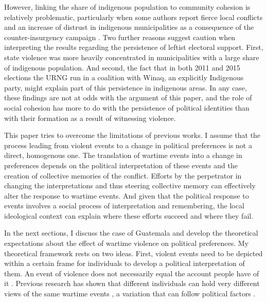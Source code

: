 \documentclass[12pt, notitlepage]{article}
\begin{document}
However, linking the share of indigenous population to community cohesion is relatively problematic, particularly when some authors report fierce local conflicts and an increase of distrust in indigenous municipalities as a consequence of the counter-insurgency campaign \citep[e.g.][]{Burrell:2013aa}.
Two further reasons suggest caution when interpreting the results regarding the persistence of leftist electoral support.
First, state violence was more heavily concentrated in municipalities with a large share of indigenous population.
And second, the fact that in both 2011 and 2015 elections the URNG run in a coalition with Winaq, an explicitly Indigenous party, might explain part of this persistence in indigenous areas.
In any case, these findings are not at odds with the argument of this paper, and the role of social cohesion has more to do with the persistence of political identities than with their formation as a result of witnessing violence.

This paper tries to overcome the limitations of previous works.
I assume that the process leading from violent events to a change in political preferences is not a direct, homogenous one.
The translation of wartime events into a change in preferences depends on the political interpretation of these events and the creation of collective memories of the conflict.
Efforts by the perpetrator in changing the interpretations and thus steering collective memory can effectively alter the response to wartime events.
And given that the political response to events involves a social process of interpretation and remembering, the local ideological context can explain where these efforts succeed and where they fail.

In the next sections, I discuss the case of Guatemala and develop the theoretical expectations about the effect of wartime violence on political preferences.
My theoretical framework rests on two ideas.
First, violent events need to be depicted within a certain frame for individuals to develop a political interpretation of them.
An event of violence does not necessarily equal the account people have of it \citep{Basta:2018aa}.
Previous research has shown that different individuals can hold very different views of the same wartime events \citep{Driscoll:2016aa}, a variation that can follow political factors \citep{Silverman:2019aa}.
\end{document}
